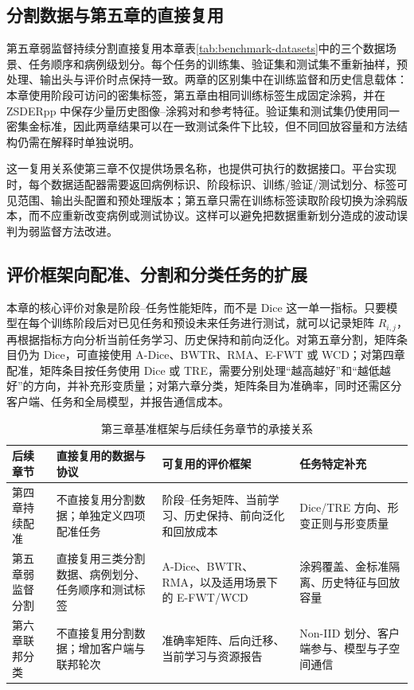 \subsection{分割数据与第五章的直接复用}

第五章弱监督持续分割直接复用本章表\ref{tab:benchmark-datasets}中的三个数据场景、任务顺序和病例级划分。每个任务的训练集、验证集和测试集不重新抽样，预处理、输出头与评价时点保持一致。两章的区别集中在训练监督和历史信息载体：本章使用阶段可访问的密集标签，第五章由相同训练标签生成固定涂鸦，并在 ZSDERpp 中保存少量历史图像--涂鸦对和参考特征。验证集和测试集仍使用同一密集金标准，因此两章结果可以在一致测试条件下比较，但不同回放容量和方法结构仍需在解释时单独说明。

这一复用关系使第三章不仅提供场景名称，也提供可执行的数据接口。平台实现时，每个数据适配器需要返回病例标识、阶段标识、训练/验证/测试划分、标签可见范围、输出头配置和预处理版本；第五章只需在训练标签读取阶段切换为涂鸦版本，而不应重新改变病例或测试协议。这样可以避免把数据重新划分造成的波动误判为弱监督方法改进。

\subsection{评价框架向配准、分割和分类任务的扩展}

本章的核心评价对象是阶段--任务性能矩阵，而不是 Dice 这一单一指标。只要模型在每个训练阶段后对已见任务和预设未来任务进行测试，就可以记录矩阵 $R_{i,j}$，再根据指标方向分析当前任务学习、历史保持和前向泛化。对第五章分割，矩阵条目仍为 Dice，可直接使用 A-Dice、BWTR、RMA、E-FWT 或 WCD；对第四章配准，矩阵条目按任务使用 Dice 或 TRE，需要分别处理“越高越好”和“越低越好”的方向，并补充形变质量；对第六章分类，矩阵条目为准确率，同时还需区分客户端、任务和全局模型，并报告通信成本。

\begin{table}[htbp]
\centering
\caption{第三章基准框架与后续任务章节的承接关系}
\label{tab:benchmark-followup}
\thesistablefont
\setlength{\tabcolsep}{3pt}
\renewcommand{\arraystretch}{1.18}
\begin{tabularx}{\textwidth}{@{}p{2.0cm}XXX@{}}
\toprule
后续章节 & 直接复用的数据与协议 & 可复用的评价框架 & 任务特定补充 \\
\midrule
第四章持续配准 & 不直接复用分割数据；单独定义四项配准任务 & 阶段--任务矩阵、当前学习、历史保持、前向泛化和回放成本 & Dice/TRE 方向、形变正则与形变质量 \\
第五章弱监督分割 & 直接复用三类分割数据、病例划分、任务顺序和测试标签 & A-Dice、BWTR、RMA，以及适用场景下的 E-FWT/WCD & 涂鸦覆盖、金标准隔离、历史特征与回放容量 \\
第六章联邦分类 & 不直接复用分割数据；增加客户端与联邦轮次 & 准确率矩阵、后向迁移、当前学习与资源报告 & Non-IID 划分、客户端参与、模型与子空间通信 \\
\bottomrule
\end{tabularx}
\end{table}

